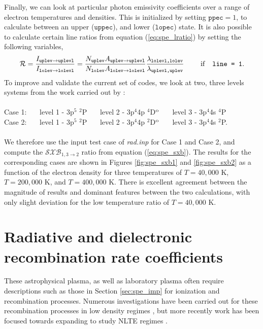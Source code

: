 Finally, we can look at particular photon emissivity coefficients over a range of electron temperatures and densities. This is initialized by setting $\texttt{ppec} = 1$, to calculate between an upper ($\texttt{uppec}$), and lower ($\texttt{lopec}$) state. It is also possible to calculate certain line ratios from equation (\ref{eq:spe_lratio}) by setting the following variables,
\[
\mathcal{R} = \frac{I_{\texttt{uplev}\rightarrow \texttt{uplevl}}}{I_{\texttt{lolev} \rightarrow \texttt{lolevl}}} = \frac{N_{\texttt{uplev}} A_{\texttt{uplev}\rightarrow \texttt{uplevl}}}{N_{\texttt{lolev}} A_{\texttt{lolev}\rightarrow \texttt{lolevl}}}\frac{\lambda_{\texttt{lolevl,lolev}}}{\lambda_{\texttt{uplevl,uplev}}} ~~~~~~~ {\rm if} ~~~ \texttt{line = 1}.
\]
To improve and validate the current set of codes, we look at two, three levels systems from the work carried out by \citet{2007JPhB...40.4537G}:\\\\
Case 1: ~~~level 1 - 3p$^5$ $^2$P ~~~level 2 - 3p$^4$4p $^4$D$^{\rm o}$  ~~~level 3 - 3p$^4$4s $^4$P\\
Case 2: ~~~level 1 - 3p$^5$ $^2$P ~~~level 2 - 3p$^4$4p $^2$D$^{\rm o}$ ~~~level 3 - 3p$^4$4s $^2$P.\\\\
We therefore use the input test case of \textit{rad.inp} for Case 1 and Case 2, and compute the $\mathcal{SXB}_{1,3\rightarrow 2}$ ratio from equation (\ref{eq:spe_sxb}). The results for the corresponding cases are shown in Figures \ref{fig:spe_sxb1} and \ref{fig:spe_sxb2} as a function of the electron density for three temperatures of $T=40,000$ K, $T=200,000$ K, and $T=400,000$ K. There is excellent agreement between the magnitude of results and dominant features between the two calculations, with only slight deviation for the low temperature ratio of $T=40,000$ K.
\newpage

\section{Radiative and dielectronic recombination rate coefficients}\label{sec:spe_rranddr}
These astrophysical plasma, as well as laboratory plasma often require descriptions such as those in Section \ref{sec:spe_imp} for ionization and recombination processes. Numerous investigations have been carried out for these recombination processes in low density regimes \citep{1982ApJS...48...95S, 1985A&AS...60..425A, 1991A&A...251..680P}, but more recently work has been focused towards expanding to study NLTE regimes \citep{2003A&A...406.1151B, 2006ApJ...651L..73B, 2005ApJS..158...80N}.


